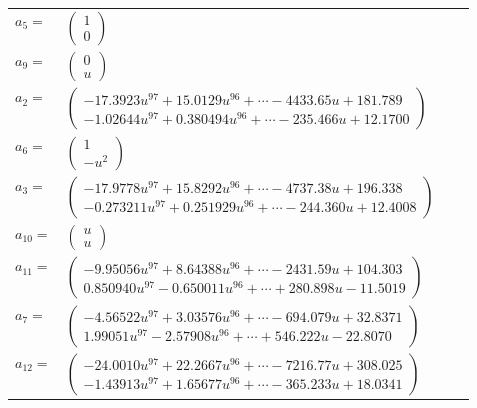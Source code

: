 \documentclass[1p]{elsarticle_modified}
\theoremstyle{definition}
\begin{document}
\begin{tabular}{m{7pt} m{180pt} m{7pt} m{180pt} }
\flushright $a_{5}=$&$\begin{pmatrix}1\\0\end{pmatrix}$ \\
\flushright $a_{9}=$&$\begin{pmatrix}0\\u\end{pmatrix}$ \\
\flushright $a_{2}=$&$\begin{pmatrix}-17.3923 u^{97}+15.0129 u^{96}+\cdots-4433.65 u+181.789\\-1.02644 u^{97}+0.380494 u^{96}+\cdots-235.466 u+12.1700\end{pmatrix}$ \\
\flushright $a_{6}=$&$\begin{pmatrix}1\\- u^2\end{pmatrix}$ \\
\flushright $a_{3}=$&$\begin{pmatrix}-17.9778 u^{97}+15.8292 u^{96}+\cdots-4737.38 u+196.338\\-0.273211 u^{97}+0.251929 u^{96}+\cdots-244.360 u+12.4008\end{pmatrix}$ \\
\flushright $a_{10}=$&$\begin{pmatrix}u\\u\end{pmatrix}$ \\
\flushright $a_{11}=$&$\begin{pmatrix}-9.95056 u^{97}+8.64388 u^{96}+\cdots-2431.59 u+104.303\\0.850940 u^{97}-0.650011 u^{96}+\cdots+280.898 u-11.5019\end{pmatrix}$ \\
\flushright $a_{7}=$&$\begin{pmatrix}-4.56522 u^{97}+3.03576 u^{96}+\cdots-694.079 u+32.8371\\1.99051 u^{97}-2.57908 u^{96}+\cdots+546.222 u-22.8070\end{pmatrix}$ \\
\flushright $a_{12}=$&$\begin{pmatrix}-24.0010 u^{97}+22.2667 u^{96}+\cdots-7216.77 u+308.025\\-1.43913 u^{97}+1.65677 u^{96}+\cdots-365.233 u+18.0341\end{pmatrix}$ \\

\end{tabular}
\end{document}

